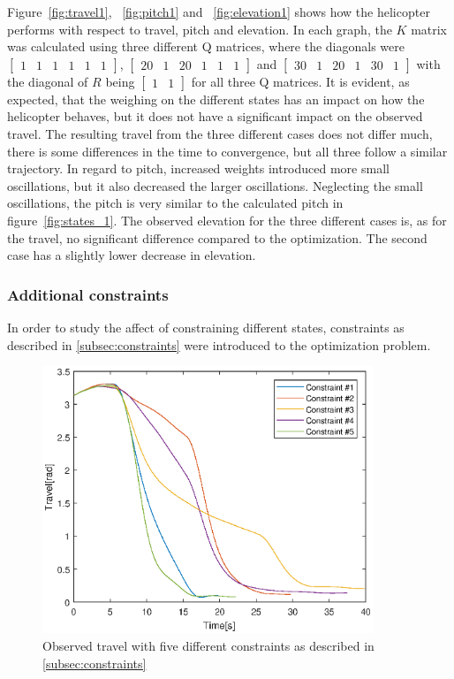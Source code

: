 Figure~\ref{fig:travel1}, ~\ref{fig:pitch1} and ~\ref{fig:elevation1} shows how the helicopter performs with respect to travel, pitch and elevation. In each graph, the $K$ matrix was calculated using three different Q matrices, where the diagonals were $[\begin{matrix}
   1 & 1 & 1 & 1 & 1 & 1\end{matrix}]$, $[\begin{matrix}
   20 & 1 & 20 & 1 & 1 & 1\end{matrix}]$ and $[\begin{matrix}
   30 & 1 & 20 & 1 & 30 & 1\end{matrix}]$ with the diagonal of $R$ being $[\begin{matrix}1 & 1\end{matrix}]$ for all three Q matrices. 
It is evident, as expected, that the weighing on the different states has an impact on how the helicopter behaves, but it does not have a significant impact on the observed travel. The resulting travel from the three different cases does not differ much, there is some differences in the time to convergence, but all three follow a similar trajectory. 
In regard to pitch, increased weights introduced more small oscillations, but it also decreased the larger oscillations. Neglecting the small oscillations, the pitch is very similar to the calculated pitch in figure~\ref{fig:states_1}.
The observed elevation for the three different cases is, as for the travel, no significant difference compared to the optimization. The second case has a slightly lower decrease in elevation.

\subsubsection{Additional constraints}
In order to study the affect of constraining different states, constraints as described in \ref{subsec:constraints} were introduced to the optimization problem.

\begin{figure}[H]
\includegraphics[width=1\linewidth, height=8cm]{data_10.4/constraints_eps.eps} 
\centering
\caption{Observed travel with five different constraints as described in \ref{subsec:constraints}}\label{fig:ctravel}
\end{figure}

